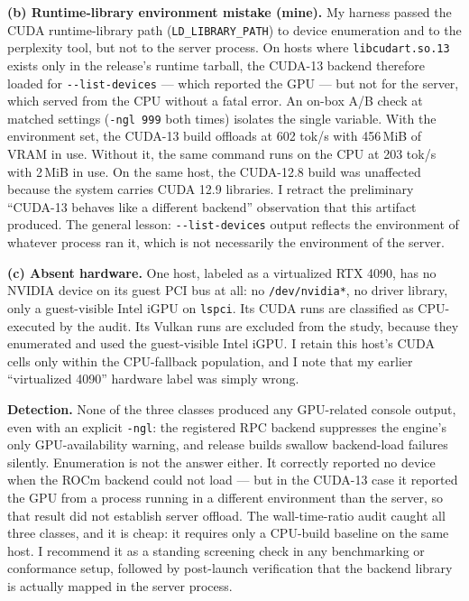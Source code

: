 \documentclass[11pt]{article}
\begin{document}
\textbf{(b) Runtime-library environment mistake (mine).} My harness
passed the CUDA runtime-library path (\texttt{LD\_LIBRARY\_PATH}) to
device enumeration and to the perplexity tool, but not to the server
process. On hosts where \texttt{libcudart.so.13} exists only in the
release's runtime tarball, the CUDA-13 backend therefore loaded for
\texttt{-{}-list-devices} --- which reported the GPU --- but not for
the server, which served from the CPU without a fatal error. An on-box
A/B check at matched settings (\texttt{-ngl 999} both times) isolates
the single variable. With the environment set, the CUDA-13 build
offloads at 602 tok/s with 456\,MiB of VRAM in use. Without it, the
same command runs on the CPU at 203 tok/s with 2\,MiB in use. On the
same host, the CUDA-12.8 build was unaffected because the system
carries CUDA 12.9 libraries. I retract the preliminary ``CUDA-13
behaves like a different backend'' observation that this artifact
produced. The general lesson: \texttt{-{}-list-devices} output
reflects the environment of whatever process ran it, which is not
necessarily the environment of the server.

\textbf{(c) Absent hardware.} One host, labeled as a virtualized RTX
4090, has no NVIDIA device on its guest PCI bus at all: no
\texttt{/dev/nvidia*}, no driver library, only a guest-visible Intel
iGPU on \texttt{lspci}. Its CUDA runs are classified as CPU-executed
by the audit. Its Vulkan runs are excluded from the study, because
they enumerated and used the guest-visible Intel iGPU. I retain this
host's CUDA cells only within the CPU-fallback population, and I note
that my earlier ``virtualized 4090'' hardware label was simply wrong.

\textbf{Detection.} None of the three classes produced any
GPU-related console output, even with an explicit \texttt{-ngl}: the
registered RPC backend suppresses the engine's only GPU-availability
warning, and release builds swallow backend-load failures silently.
Enumeration is not the answer either. It correctly reported no device
when the ROCm backend could not load --- but in the CUDA-13 case it
reported the GPU from a process running in a different environment
than the server, so that result did not establish server offload. The
wall-time-ratio audit caught all three classes, and it is cheap: it
requires only a CPU-build baseline on the same host. I recommend it as
a standing screening check in any benchmarking or conformance setup,
followed by post-launch verification that the backend library is
actually mapped in the server process.
\end{document}
